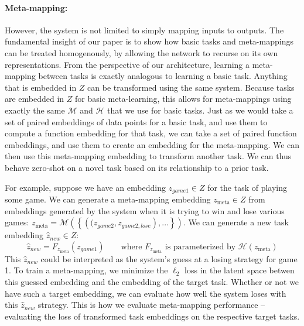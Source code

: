\documentclass{article}
\begin{document}
\paragraph{Meta-mapping:} However, the system is not limited to simply mapping inputs to outputs. The fundamental insight of our paper is to show how basic tasks and meta-mappings can be treated homogenously, by allowing the network to recurse on its own representations. From the perspective of our architecture, learning a meta-mapping between tasks is exactly analogous to learning a basic task. Anything that is embedded in $Z$ can be transformed using the same system. Because tasks are embedded in $Z$ for basic meta-learning, this allows for meta-mappings using exactly the same $\mathcal{M}$ and $\mathcal{H}$ that we use for basic tasks. Just as we would take a set of paired embeddings of data points for a basic task, and use them to compute a function embedding for that task, we can take a set of paired function embeddings, and use them to create an embedding for the meta-mapping. We can then use this meta-mapping embedding to transform another task. We can thus behave zero-shot on a novel task based on its relationship to a prior task. \par
For example, suppose we have an embedding $z_{game1} \in Z$ for the task of playing some game. We can generate a meta-mapping embedding $z_{\text{meta}} \in Z$ from embeddings generated by the system when it is trying to win and lose various games: $z_{\text{meta}} = \mathcal{M}\left( \left\{\left((z_{game2},z_{game2,lose}\right), ... \right\}\right)$. We can generate a new task embedding $\hat{z}_{new} \in Z$:  
\[\hat{z}_{new} = F_{z_{\text{meta}}}(z_{game1}) \qquad \text{where } F_{z_{\text{meta}}} \text{ is parameterized by } \mathcal{H}\left(z_{\text{meta}}\right)\]
This $\hat{z}_{new}$ could be interpreted as the system's guess at a losing strategy for game 1. To train a meta-mapping, we minimize the $\ell_2$ loss in the latent space betwen this guessed embedding and the embedding of the target task. Whether or not we have such a target embedding, we can evaluate how well the system loses with this $\hat{z}_{new}$ strategy. This is how we evaluate meta-mapping performance -- evaluating the loss of transformed task embeddings on the respective target tasks. \par
\end{document}
